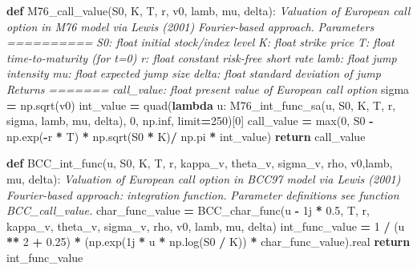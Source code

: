 \documentclass[
]{book}
\newenvironment{Shaded}{\begin{snugshade}}{\end{snugshade}}
\newcommand{\BuiltInTok}[1]{#1}
\newcommand{\CommentTok}[1]{\textcolor[rgb]{0.56,0.35,0.01}{\textit{#1}}}
\newcommand{\ControlFlowTok}[1]{\textcolor[rgb]{0.13,0.29,0.53}{\textbf{#1}}}
\newcommand{\DecValTok}[1]{\textcolor[rgb]{0.00,0.00,0.81}{#1}}
\newcommand{\FloatTok}[1]{\textcolor[rgb]{0.00,0.00,0.81}{#1}}
\newcommand{\KeywordTok}[1]{\textcolor[rgb]{0.13,0.29,0.53}{\textbf{#1}}}
\newcommand{\NormalTok}[1]{#1}
\newcommand{\OperatorTok}[1]{\textcolor[rgb]{0.81,0.36,0.00}{\textbf{#1}}}
\newcommand{\OtherTok}[1]{\textcolor[rgb]{0.56,0.35,0.01}{#1}}
\begin{document}
\begin{Shaded}
\begin{Highlighting}[]
\KeywordTok{def}\NormalTok{ M76\_call\_value(S0, K, T, r, v0, lamb, mu, delta):}
  \CommentTok{\textquotesingle{}\textquotesingle{}\textquotesingle{} Valuation of European call option in M76 model via Lewis (2001)}
\CommentTok{  Fourier{-}based approach.}
\CommentTok{  Parameters}
\CommentTok{  ==========}
\CommentTok{  S0: float}
\CommentTok{  initial stock/index level}
\CommentTok{  K: float}
\CommentTok{  strike price}
\CommentTok{  T: float}
\CommentTok{  time{-}to{-}maturity (for t=0)}
\CommentTok{  r: float}
\CommentTok{  constant risk{-}free short rate}
\CommentTok{  lamb: float}
\CommentTok{  jump intensity}
\CommentTok{  mu: float}
\CommentTok{  expected jump size}
\CommentTok{  delta: float}
\CommentTok{  standard deviation of jump}
\CommentTok{  Returns}
\CommentTok{  =======}
\CommentTok{  call\_value: float}
\CommentTok{  present value of European call option}
\CommentTok{  \textquotesingle{}\textquotesingle{}\textquotesingle{}}
\NormalTok{  sigma }\OperatorTok{=}\NormalTok{ np.sqrt(v0)}
\NormalTok{  int\_value }\OperatorTok{=}\NormalTok{ quad(}\KeywordTok{lambda}\NormalTok{ u: M76\_int\_func\_sa(u, S0, K, T, r,}
\NormalTok{  sigma, lamb, mu, delta), }\DecValTok{0}\NormalTok{, np.inf, limit}\OperatorTok{=}\DecValTok{250}\NormalTok{)[}\DecValTok{0}\NormalTok{]}
\NormalTok{  call\_value }\OperatorTok{=} \BuiltInTok{max}\NormalTok{(}\DecValTok{0}\NormalTok{, S0 }\OperatorTok{{-}}\NormalTok{ np.exp(}\OperatorTok{{-}}\NormalTok{r }\OperatorTok{*}\NormalTok{ T) }\OperatorTok{*}\NormalTok{ np.sqrt(S0 }\OperatorTok{*}\NormalTok{ K)}\OperatorTok{/}\NormalTok{ np.pi }\OperatorTok{*}\NormalTok{ int\_value)}
  \ControlFlowTok{return}\NormalTok{ call\_value}

\KeywordTok{def}\NormalTok{ BCC\_int\_func(u, S0, K, T, r, kappa\_v, theta\_v, sigma\_v, rho, v0,lamb, mu, delta):}
  \CommentTok{\textquotesingle{}\textquotesingle{}\textquotesingle{} Valuation of European call option in BCC97 model via Lewis (2001)}
\CommentTok{  Fourier{-}based approach: integration function.}
\CommentTok{  Parameter definitions see function BCC\_call\_value.\textquotesingle{}\textquotesingle{}\textquotesingle{}}
\NormalTok{  char\_func\_value }\OperatorTok{=}\NormalTok{ BCC\_char\_func(u }\OperatorTok{{-}} \OtherTok{1j} \OperatorTok{*} \FloatTok{0.5}\NormalTok{, T, r, kappa\_v, theta\_v, sigma\_v, rho, v0, lamb, mu, delta)}
\NormalTok{  int\_func\_value }\OperatorTok{=} \DecValTok{1} \OperatorTok{/}\NormalTok{ (u }\OperatorTok{**} \DecValTok{2} \OperatorTok{+} \FloatTok{0.25}\NormalTok{) }\OperatorTok{*}\NormalTok{ (np.exp(}\OtherTok{1j} \OperatorTok{*}\NormalTok{ u }\OperatorTok{*}\NormalTok{ np.log(S0 }\OperatorTok{/}\NormalTok{ K)) }\OperatorTok{*}\NormalTok{ char\_func\_value).real}
  \ControlFlowTok{return}\NormalTok{ int\_func\_value}


\end{Highlighting}
\end{Shaded}
\end{document}
